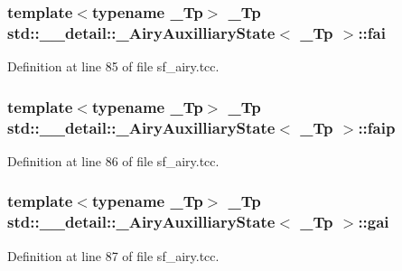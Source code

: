 \subsubsection[{\texorpdfstring{fai}{fai}}]{\setlength{\rightskip}{0pt plus 5cm}template$<$typename \+\_\+\+Tp$>$ \+\_\+\+Tp {\bf std\+::\+\_\+\+\_\+detail\+::\+\_\+\+Airy\+Auxilliary\+State}$<$ \+\_\+\+Tp $>$\+::fai}\hypertarget{structstd_1_1____detail_1_1__AiryAuxilliaryState_a8724d2e0db16b03e3e7e89b54ec96c77}{}\label{structstd_1_1____detail_1_1__AiryAuxilliaryState_a8724d2e0db16b03e3e7e89b54ec96c77}


Definition at line 85 of file sf\+\_\+airy.\+tcc.

\subsubsection[{\texorpdfstring{faip}{faip}}]{\setlength{\rightskip}{0pt plus 5cm}template$<$typename \+\_\+\+Tp$>$ \+\_\+\+Tp {\bf std\+::\+\_\+\+\_\+detail\+::\+\_\+\+Airy\+Auxilliary\+State}$<$ \+\_\+\+Tp $>$\+::faip}\hypertarget{structstd_1_1____detail_1_1__AiryAuxilliaryState_aa05bb6a248abbc7e8b1aca419fc8f3b7}{}\label{structstd_1_1____detail_1_1__AiryAuxilliaryState_aa05bb6a248abbc7e8b1aca419fc8f3b7}


Definition at line 86 of file sf\+\_\+airy.\+tcc.

\subsubsection[{\texorpdfstring{gai}{gai}}]{\setlength{\rightskip}{0pt plus 5cm}template$<$typename \+\_\+\+Tp$>$ \+\_\+\+Tp {\bf std\+::\+\_\+\+\_\+detail\+::\+\_\+\+Airy\+Auxilliary\+State}$<$ \+\_\+\+Tp $>$\+::gai}\hypertarget{structstd_1_1____detail_1_1__AiryAuxilliaryState_a7e0297ccb071de8b62071733b3339291}{}\label{structstd_1_1____detail_1_1__AiryAuxilliaryState_a7e0297ccb071de8b62071733b3339291}


Definition at line 87 of file sf\+\_\+airy.\+tcc.

